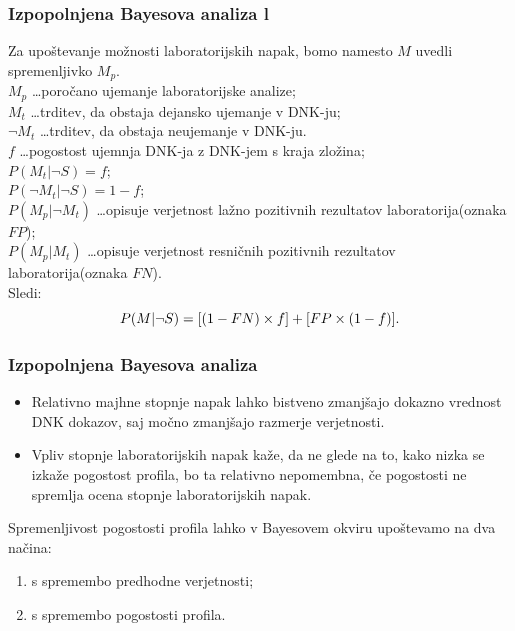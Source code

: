 \documentclass{beamer}
\begin{document}
\begin{frame}
    \frametitle{Izpopolnjena Bayesova analiza l}
    Za upoštevanje možnosti laboratorijskih napak, bomo namesto $M$ uvedli spremenljivko $M_p$.\\ \vspace{3mm}
    $M_p$ \dots poročano ujemanje laboratorijske analize; \\ 
    $M_t$ \dots trditev, da obstaja dejansko ujemanje v DNK-ju;\\
    $\neg M_t$ \dots trditev, da obstaja neujemanje v DNK-ju.  \\ 
    $f$ \dots pogostost ujemnja DNK-ja z DNK-jem s kraja zložina;\\
    $P(M_t \lvert \neg S) = f$; \\
    $P(\neg M_t \lvert \neg S) = 1-f$;\\
    $P(M_p \lvert \neg M_t)$ \dots opisuje verjetnost lažno pozitivnih rezultatov laboratorija(oznaka $FP$);\\
    $P(M_p \lvert M_t)$ \dots opisuje verjetnost resničnih pozitivnih rezultatov laboratorija(oznaka $FN$).\\\vspace{3mm}
    Sledi:
    \[
        P(M \lvert \neg S) = [(1 - FN) \times f] + [FP \times (1 - f)]. \vspace{2mm}
    \]
\end{frame}
 
\begin{frame}
    \frametitle{Izpopolnjena Bayesova analiza}
    \begin{itemize}
        \item Relativno majhne stopnje napak lahko bistveno zmanjšajo dokazno vrednost DNK dokazov, saj močno zmanjšajo razmerje verjetnosti.
        \item Vpliv stopnje laboratorijskih napak kaže, da ne glede na to, kako nizka se izkaže pogostost profila, bo ta relativno nepomembna, če pogostosti ne spremlja ocena stopnje laboratorijskih napak.
    \end{itemize} \vspace{3mm}
    Spremenljivost pogostosti profila lahko v Bayesovem okviru upoštevamo na dva načina: 
    \begin{enumerate}
        \item s spremembo predhodne verjetnosti;
        \item s spremembo pogostosti profila.
    \end{enumerate}
\end{frame}
\end{document}
